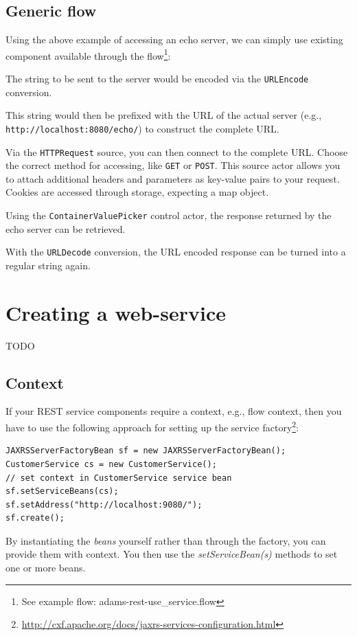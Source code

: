 \documentclass[a4paper]{book}
\begin{document}
\subsection{Generic flow}
Using the above example of accessing an echo server, we can simply use existing
component available through the flow\footnote{See example flow: adams-rest-use\_service.flow}:
\begin{tight_itemize}
  \item The string to be sent to the server would be encoded via the \verb|URLEncode|
  conversion.
  \item This string would then be prefixed with the URL of the actual server
  (e.g., \verb|http://localhost:8080/echo/|) to construct the complete URL.
  \item Via the \verb|HTTPRequest| source, you can then connect to the
  complete URL. Choose the correct method for accessing, like \verb|GET|
  or \verb|POST|. This source actor allows you to attach additional headers and
  parameters as key-value pairs to your request. Cookies are accessed through
  storage, expecting a map object.
  \item Using the \verb|ContainerValuePicker| control actor, the response
  returned by the echo server can be retrieved.
  \item With the \verb|URLDecode| conversion, the URL encoded response can
  be turned into a regular string again.
\end{tight_itemize}

\section{Creating a web-service}
TODO

\subsection{Context}
If your REST service components require a context, e.g., flow context, then
you have to use the following approach for setting up the service
factory\footnote{\url{http://cxf.apache.org/docs/jaxrs-services-configuration.html}{}}:
\begin{verbatim}
JAXRSServerFactoryBean sf = new JAXRSServerFactoryBean();
CustomerService cs = new CustomerService();
// set context in CustomerService service bean
sf.setServiceBeans(cs);
sf.setAddress("http://localhost:9080/");
sf.create();
\end{verbatim}
By instantiating the \textit{beans} yourself rather than through the factory,
you can provide them with context. You then use the \textit{setServiceBean(s)}
methods to set one or more beans.
\end{document}
